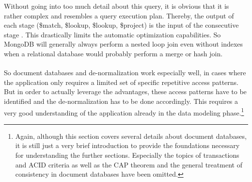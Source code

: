 Without going into too much detail about this query, it is obvious that it is rather complex and resembles a query execution plan. Thereby, the output of each stage (\$match, \$lookup, \$lookup, \$project) is the input of the consecutive stage \cite{MongoDBAggrPipeline}. This drastically limits the automatic optimization capabilities. So MongoDB will generally always perform a nested loop join even without indexes when a relational database would probably perform a merge or hash join.\\\\ 
So document databases and de-normalization work especially well, in cases where the application only requires a limited set of specific repetitive access patterns. But in order to actually leverage the advantages, these access patterns have to be identified and the de-normalization has to be done accordingly. This requires a very good understanding of the application already in the data modeling phase.\footnote{Again, although this section covers several details about document databases, it is still just a very brief introduction to provide the foundations necessary for understanding the further sections. Especially the topics of transactions and ACID criteria as well as the CAP %
theorem and the general treatment of consistency in document databases have been omitted.} 


